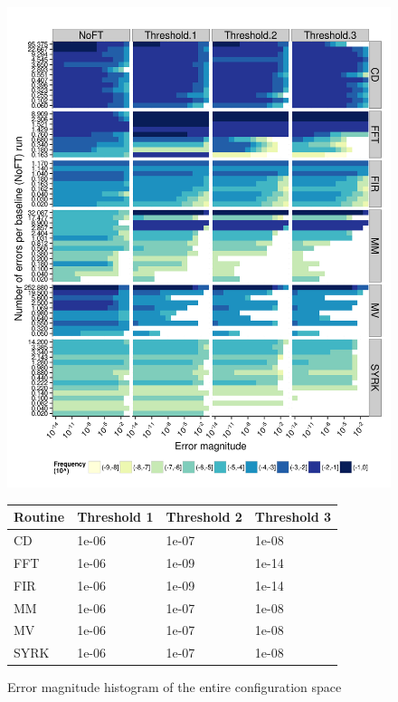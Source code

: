\documentclass{sig-alternate}
\begin{document}
\begin{figure}[ht!]
\centering
\includegraphics[width=1.00\columnwidth]{figs/4_1_1_Exp2_2_Heatmap_Error_ConfSpace.png}
\begin{tabular}{|p{0.5in}|p{0.7in}|p{0.7in}|p{0.7in}|}
\hline
Routine & Threshold 1 & Threshold 2 & Threshold 3 \\
\hline
\hline
CD & 1e-06 & 1e-07 & 1e-08 \\
\hline
FFT & 1e-06 & 1e-09 & 1e-14 \\
\hline
FIR & 1e-06 & 1e-09 & 1e-14 \\
\hline
MM & 1e-06 & 1e-07 & 1e-08 \\
\hline
MV & 1e-06 & 1e-07 & 1e-08 \\
\hline
SYRK & 1e-06 & 1e-07 & 1e-08 \\
\hline
\end{tabular}
\caption{Error magnitude histogram of the entire configuration space}
\label{fig:algo_err_heatmap}
\end{figure}
\end{document}
